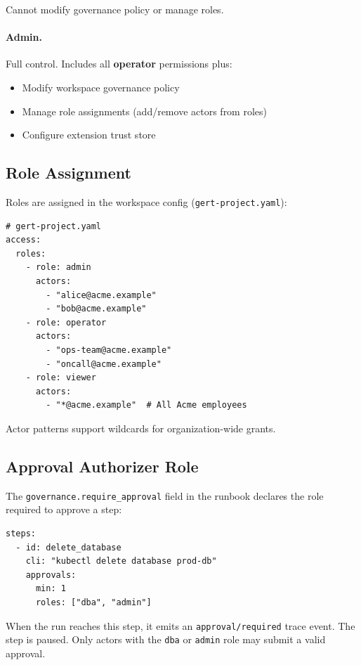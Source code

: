 Cannot modify governance policy or manage roles.

\paragraph{Admin.}
Full control.  Includes all \textbf{operator} permissions plus:

\begin{itemize}
  \item Modify workspace governance policy
  \item Manage role assignments (add/remove actors from roles)
  \item Configure extension trust store
\end{itemize}

\subsection{Role Assignment}

Roles are assigned in the workspace config (\texttt{gert-project.yaml}):

\begin{verbatim}
# gert-project.yaml
access:
  roles:
    - role: admin
      actors:
        - "alice@acme.example"
        - "bob@acme.example"
    - role: operator
      actors:
        - "ops-team@acme.example"
        - "oncall@acme.example"
    - role: viewer
      actors:
        - "*@acme.example"  # All Acme employees
\end{verbatim}

Actor patterns support wildcards for organization-wide grants.

\subsection{Approval Authorizer Role}

The \texttt{governance.require\_approval} field in the runbook declares the
role required to approve a step:

\begin{verbatim}
steps:
  - id: delete_database
    cli: "kubectl delete database prod-db"
    approvals:
      min: 1
      roles: ["dba", "admin"]
\end{verbatim}

When the run reaches this step, it emits an
\texttt{approval/required} trace event.  The step is paused.  Only actors with
the \texttt{dba} or \texttt{admin} role may submit a valid approval.

